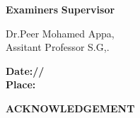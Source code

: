 \documentclass[10pt]{report}
\begin{document}
\vspace{4.0cm}
\begin{flushleft}
\Large \textbf{Examiners} \hfill \Large \textbf{Supervisor}\\
\end{flushleft}
\begin{flushright}
Dr.Peer Mohamed Appa, \\
 Assitant Professor S.G,.
\end{flushright}
\vspace{1.0cm}
\begin{flushleft}
\large{\textbf{Date:\hspace*{1.0cm}/\hspace*{2.0cm}/}}\\
\large{\textbf{Place:}}
\end{flushleft}
\newpage
\begin{center}
\LARGE{\textbf{ACKNOWLEDGEMENT}}\\[1cm]
\end{center}
\linespread{1.13}
\end{document}

